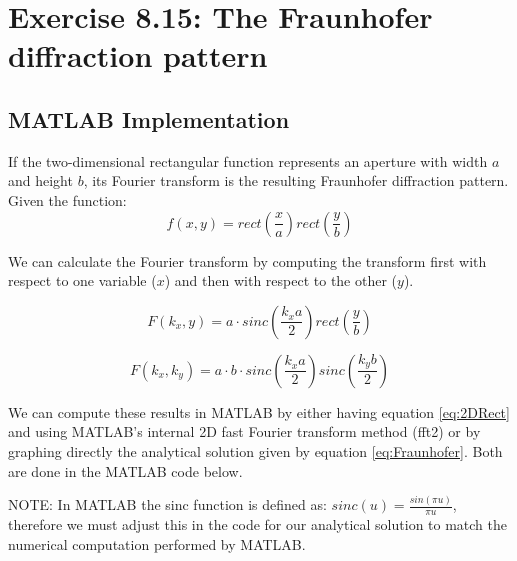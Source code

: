 
\section{Exercise 8.15: The Fraunhofer diffraction pattern}
\subsection{MATLAB Implementation}

If the two-dimensional rectangular function represents an aperture with width $a$ and height $b$, its Fourier transform is the resulting Fraunhofer diffraction pattern. Given the function:
\begin{equation}
\label{eq:2DRect}
    f(x,y) = rect \left( \frac{x}{a} \right) rect \left( \frac{y}{b} \right)
\end{equation}

We can calculate the Fourier transform by computing the transform first with respect to one variable ($x$) and then with respect to the other ($y$).

\begin{equation}
    F(k_x,y) = a \cdot sinc \left( \frac{k_x a}{2} \right) rect \left( \frac{y}{b} \right)
\end{equation}

\begin{equation}
\label{eq:Fraunhofer}
    F(k_x,k_y) = a \cdot b \cdot sinc \left( \frac{k_x a}{2} \right) sinc \left( \frac{k_y b}{2} \right)
\end{equation}

We can compute these results in MATLAB by either having equation \ref{eq:2DRect} and using MATLAB's internal 2D fast Fourier transform method (fft2) or by graphing directly the analytical solution given by equation \ref{eq:Fraunhofer}. Both are done in the MATLAB code below.

NOTE: In MATLAB the sinc function is defined as: $sinc(u) = \frac{sin(\pi u)}{\pi u}$, therefore we must adjust this in the code for our analytical solution to match the numerical computation performed by MATLAB. 

